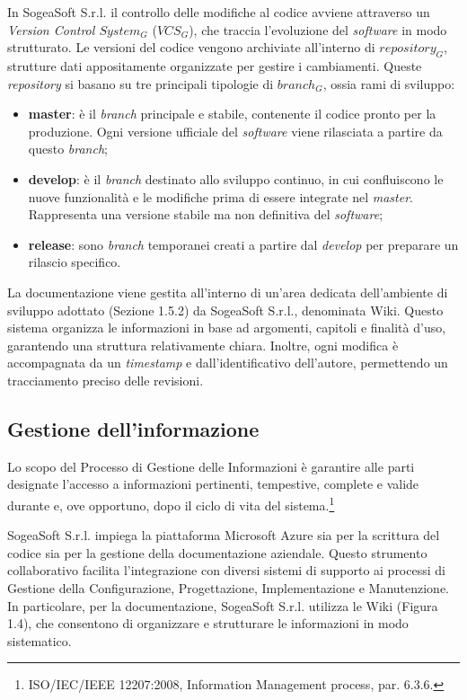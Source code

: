         \vspace{0.2 em}
        \noindent In SogeaSoft S.r.l. il controllo delle modifiche al codice avviene attraverso un \textit{Version Control $System_G$} ($VCS_G$), che traccia l’evoluzione del \textit{software} in modo strutturato. Le versioni del codice vengono archiviate all’interno di \textit{$repository_G$}, strutture dati appositamente organizzate per gestire i cambiamenti. 
        \noindent Queste \textit{repository} si basano su tre principali tipologie di \textit{$branch_G$}, ossia rami di sviluppo:  
        \begin{itemize}
            \item \textbf{master}: è il \textit{branch} principale e stabile, contenente il codice pronto per la produzione. Ogni versione ufficiale del \textit{software} viene rilasciata a partire da questo \textit{branch}; 
            \item \textbf{develop}: è il \textit{branch} destinato allo sviluppo continuo, in cui confluiscono le nuove funzionalità e le modifiche prima di essere integrate nel \textit{master}. Rappresenta una versione stabile ma non definitiva del \textit{software}; 
            \item \textbf{release}: sono \textit{branch} temporanei creati a partire dal \textit{develop} per preparare un rilascio specifico. 
        \end{itemize}

        \noindent La documentazione viene gestita all'interno di un'area dedicata dell'ambiente di sviluppo adottato (Sezione 1.5.2) da SogeaSoft S.r.l., denominata Wiki. Questo sistema organizza le informazioni in base ad argomenti, capitoli e finalità d'uso, garantendo una struttura relativamente chiara. Inoltre, ogni modifica è accompagnata da un \textit{timestamp} e dall'identificativo dell'autore, permettendo un tracciamento preciso delle revisioni. 
        
        \subsection{Gestione dell’informazione}

        Lo scopo del Processo di Gestione delle Informazioni è garantire alle parti designate l’accesso a informazioni pertinenti, tempestive, complete e valide durante e, ove opportuno, dopo il ciclo di vita del sistema.\footnote{ISO/IEC/IEEE 12207:2008, Information Management process, par. 6.3.6.}

        \vspace{0.2 em}
        \noindent SogeaSoft S.r.l. impiega la piattaforma Microsoft Azure sia per la scrittura del codice sia per la gestione della documentazione aziendale. Questo strumento collaborativo facilita l'integrazione con diversi sistemi di supporto ai processi di Gestione della Configurazione, Progettazione, Implementazione e Manutenzione. In particolare, per la documentazione, SogeaSoft S.r.l. utilizza le Wiki (Figura 1.4), che consentono di organizzare e strutturare le informazioni in modo sistematico.  

